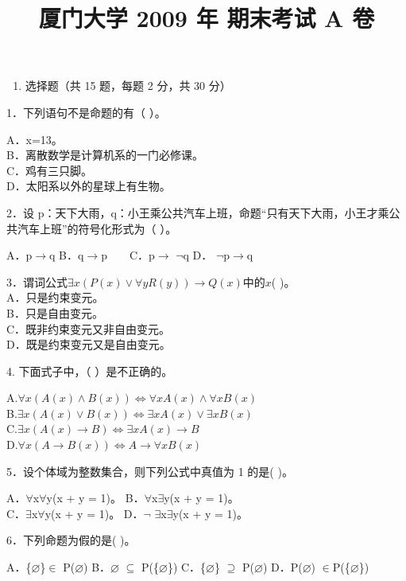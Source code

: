 \documentclass[fontset=exam]{exam-zh}
\title{厦门大学 2009 年 期末考试 A 卷}
\begin{document}
\maketitle
{}
\begin{enumerate}
\item
  选择题（共 15 题，每题 2 分，共 30 分）
\end{enumerate}

1．下列语句不是命题的有（ ）。

A．x=13。\\
B．离散数学是计算机系的一门必修课。\\
C．鸡有三只脚。\\
D．太阳系以外的星球上有生物。

2．设 p：天下大雨，q：小王乘公共汽车上班，命题``只有天下大雨，小王才乘公共汽车上班''的符号化形式为（ ）。

A．p\(\to\)q B．q\(\to\)p　　C．p\(\to\) \(\neg\)q D． \(\neg\)p\(\to\)q

3．谓词公式\(\left. \exists x(P(x) \vee \forall yR(y))\rightarrow Q(x) \right.\)中的\(x\)( )。\\
A．只是约束变元。\\
B．只是自由变元。\\
C．既非约束变元又非自由变元。\\
D．既是约束变元又是自由变元。

4. 下面式子中，（ ）是不正确的。

A.\(\left. \forall x(A(x) \land B(x))\Leftrightarrow\forall xA(x) \land \forall xB(x) \right.\)\\
B.\(\left. \exists x(A(x) \vee B(x))\Leftrightarrow\exists xA(x) \vee \exists xB(x) \right.\)\\
C.\(\left. \exists x(A(x)\rightarrow B)\Leftrightarrow\exists xA(x)\rightarrow B \right.\)\\
D.\(\left. \forall x(A\rightarrow B(x))\Leftrightarrow A\rightarrow\forall xB(x) \right.\)

5．设个体域为整数集合，则下列公式中真值为 1 的是( )。

A．\(\forall\)x\(\forall\)y(x + y = 1)。 B．\(\forall\)x\(\exists\)y(x + y = 1)。\\
C．\(\exists\)x\(\forall\)y(x + y = 1)。 D．\(\neg\) \(\exists\)x\(\exists\)y(x + y = 1)。

6．下列命题为假的是( )。

A．\{\(\varnothing\)\}\(\in\) P(\(\varnothing\)) B．\(\varnothing\) \(\subseteq\) P(\{\(\varnothing\)\}) C．\{\(\varnothing\)\} \(\supseteq\) P(\(\varnothing\)) D．P(\(\varnothing\)) \(\in\)P(\{\(\varnothing\)\})
\end{document}
